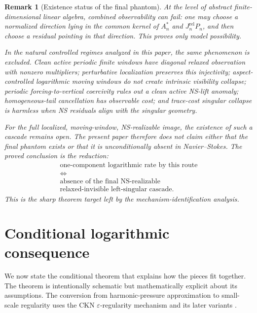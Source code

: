 \documentclass[11pt]{article}
\numberwithin{equation}{section}
\newtheorem{remark}[theorem]{Remark}
\begin{document}
\begin{remark}[Existence status of the final phantom]
At the level of abstract finite-dimensional linear algebra, combined observability can fail: one may
choose a normalized direction lying in the common kernel of \(A_n^*\) and \(J_n^{\mathrm{rel}}P_n\),
and then choose a residual pointing in that direction.  This proves only model possibility.

In the natural controlled regimes analyzed in this paper, the same phenomenon is excluded.  Clean
active periodic finite windows have diagonal relaxed observation with nonzero multipliers; perturbative
localization preserves this injectivity; aspect-controlled logarithmic moving windows do not create
intrinsic visibility collapse; periodic forcing-to-vertical coercivity rules out a clean active
NS-lift anomaly; homogeneous-tail cancellation has observable cost; and trace-cost singular collapse
is harmless when NS residuals align with the singular geometry.

For the full localized, moving-window, NS-realizable image, the existence of such a cascade remains
open.  The present paper therefore does not claim either that the final phantom exists or that it is
unconditionally absent in Navier--Stokes.  The proved conclusion is the reduction:
\[
\boxed{
\begin{gathered}
\text{one-component logarithmic rate by this route}\\
\Longleftrightarrow\\
\text{absence of the final NS-realizable}\\
\text{relaxed-invisible left-singular cascade.}
\end{gathered}}
\]
This is the sharp theorem target left by the mechanism-identification analysis.
\end{remark}

\section{Conditional logarithmic consequence}\label{sec:conditional-reduction}

We now state the conditional theorem that explains how the pieces fit together.  The theorem is intentionally schematic but mathematically explicit about its assumptions.  The conversion from harmonic-pressure approximation to small-scale regularity uses the CKN \(\varepsilon\)-regularity mechanism and its later variants \cite{CKN1982,Lin1998,GustafsonKangTsai2007,GuevaraPhuc2017,AlbrittonBarkerPrange2023}.
\end{document}
